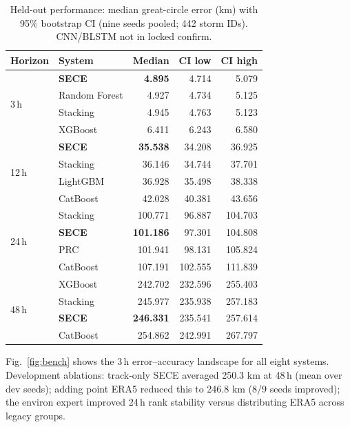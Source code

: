 \documentclass[conference]{IEEEtran}
\newcommand{\sece}{SECE}
\newcommand{\era}{ERA5}
\newcommand{\km}{\,km}
\newcommand{\npooledstorms}{442}
\begin{document}
\begin{table}[t]
\caption{Held-out performance: median great-circle error (km) with 95\% bootstrap CI (nine seeds pooled; \npooledstorms{} storm IDs). CNN/BLSTM not in locked confirm.}
\label{tab:igarss_full}
\centering
\scriptsize
\setlength{\tabcolsep}{3pt}
\begin{tabular}{@{}llrrr@{}}
\toprule
Horizon & System & Median & CI low & CI high \\
\midrule
\multirow{4}{*}{3\,h}
  & \textbf{\sece{}} & \textbf{4.895} & 4.714 & 5.079 \\
  & Random Forest & 4.927 & 4.734 & 5.125 \\
  & Stacking & 4.945 & 4.763 & 5.123 \\
  & XGBoost & 6.411 & 6.243 & 6.580 \\
\midrule
\multirow{4}{*}{12\,h}
  & \textbf{\sece{}} & \textbf{35.538} & 34.208 & 36.925 \\
  & Stacking & 36.146 & 34.744 & 37.701 \\
  & LightGBM & 36.928 & 35.498 & 38.338 \\
  & CatBoost & 42.028 & 40.381 & 43.656 \\
\midrule
\multirow{4}{*}{24\,h}
  & Stacking & 100.771 & 96.887 & 104.703 \\
  & \textbf{\sece{}} & \textbf{101.186} & 97.301 & 104.808 \\
  & PRC & 101.941 & 98.131 & 105.824 \\
  & CatBoost & 107.191 & 102.555 & 111.839 \\
\midrule
\multirow{4}{*}{48\,h}
  & XGBoost & 242.702 & 232.596 & 255.403 \\
  & Stacking & 245.977 & 235.938 & 257.183 \\
  & \textbf{\sece{}} & \textbf{246.331} & 235.541 & 257.614 \\
  & CatBoost & 254.862 & 242.991 & 267.797 \\
\bottomrule
\end{tabular}
\end{table}

Fig.~\ref{fig:bench} shows the 3\,h error--accuracy landscape for all eight systems.
Development ablations: track-only \sece{} averaged 250.3\,\km{} at 48\,h (mean over dev seeds); adding point \era{} reduced this to 246.8\,\km{} (8/9 seeds improved); the environ expert improved 24\,h rank stability versus distributing \era{} across legacy groups.
\end{document}
